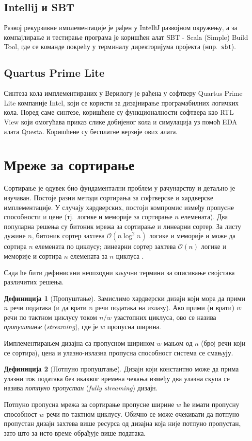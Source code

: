 \documentclass[12pt, a4paper]{article}
\theoremstyle{definition}
\newtheorem{definition}{Дефиниција}[section]
\begin{document}
\subsection{Intellij и SBT}
Развој рекурзивне имплементације је рађен у IntelliЈ развојном окружењу, а за компајлирање и тестирање програма је коришћен алат SBT - Scala (Simple) Build Tool, где се команде покрећу у терминалу директоријума пројекта (нпр.\ \verb+sbt+).

\subsection{Quartus Prime Lite}
Синтеза кола имплементираних у Верилогу је рађена у софтверу Quartus Prime Lite компаније Intel, који се користи за дизајнирање програмабилних логичких кола. Поред саме синтезе, коришћене су функционалности софтвера као RTL View који омогућава приказ слике добијеног кола и симулација уз помоћ EDA алата Questa. Коришћене су бесплатне верзије ових алата.

\newpage
\section{Мреже за сортирање}
Сортирање је одувек био фундаментални проблем у рачунарству и детаљно је изучаван. Постоје разни методи сортирања за софтверске и хардверске имплементације. У случају хардверских, постоји компромис између пропусне способности и цене (тј.\ логике и меморије за сортирање $n$ елемената). Два популарна решења су битоник мрежа за сортирање и линеарни сортер. За листу дужине $n$, битоник сортер захтева $\mathcal{O}(n \log^2 n)$ логике и меморије и може да сортира $n$ елемената по циклусу; линеарни сортер захтева $\mathcal{O}(n)$ логике и меморије и сортира $n$ елемената за $n$ циклуса \cite{zuluaga2016}.

Сада ће бити дефинисани неопходни кључни термини за описивање својстава различитих решења.
\begin{definition}[Пропуштање]
Замислимо хардверски дизајн који мора да прими $n$ речи података (и да врати $n$ речи података на излазу). Ако прими (и врати) $w$ речи по тактном циклусу током $n/w$ узастопних циклуса, ово се назива \textit{пропуштање} (\textit{streaming}), где је $w$ пропусна ширина.
\end{definition}
Имплементирањем дизајна са пропусном ширином $w$ мањом од $n$ (број речи који се сортира), цена и улазно-излазна пропусна способност система се смањују.
\begin{definition}[Потпуно пропуштање]
Дизајн који константно може да прима улазни ток података без икаквог времена чекања између два улазна скупа се назива \textit{потпуно пропустан} (\textit{fully streaming}) дизајн.
\end{definition}
Потпуно пропусна мрежа за сортирање пропусне ширине $w$ ће имати пропусну способност $w$ речи по тактном циклусу. Обично се може очекивати да потпуно пропустан дизајн захтева више ресурса од дизајна која није потпуно пропустан, зато што за исто време обрађује више података.
\end{document}
